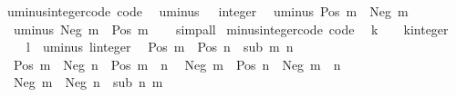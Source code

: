 \begin{isabellebody}
\isanewline
{}\isamarkupfalse%
\ uminus{\isacharunderscore}{\kern0pt}integer{\isacharunderscore}{\kern0pt}code\ {\isacharbrackleft}{\kern0pt}code{\isacharbrackright}{\kern0pt}{\isacharcolon}{\kern0pt}\isanewline
\ \ {\isachardoublequoteopen}uminus\ {}\ {\isacharequal}{\kern0pt}\ {\isacharparenleft}{\kern0pt}{}{\isacharcolon}{\kern0pt}{\isacharcolon}{\kern0pt}integer{\isacharparenright}{\kern0pt}{\isachardoublequoteclose}\isanewline
\ \ {\isachardoublequoteopen}uminus\ {\isacharparenleft}{\kern0pt}Pos\ m{\isacharparenright}{\kern0pt}\ {\isacharequal}{\kern0pt}\ Neg\ m{\isachardoublequoteclose}\isanewline
\ \ {\isachardoublequoteopen}uminus\ {\isacharparenleft}{\kern0pt}Neg\ m{\isacharparenright}{\kern0pt}\ {\isacharequal}{\kern0pt}\ Pos\ m{\isachardoublequoteclose}\isanewline
%
\isadelimproof
\ \ %
\endisadelimproof
%
\isatagproof
{}\isamarkupfalse%
\ simp{\isacharunderscore}{\kern0pt}all%
\endisatagproof
{\isafoldproof}%
%
\isadelimproof
\isanewline
%
\endisadelimproof
\isanewline
{}\isamarkupfalse%
\ minus{\isacharunderscore}{\kern0pt}integer{\isacharunderscore}{\kern0pt}code\ {\isacharbrackleft}{\kern0pt}code{\isacharbrackright}{\kern0pt}{\isacharcolon}{\kern0pt}\isanewline
\ \ {\isachardoublequoteopen}k\ {\isacharminus}{\kern0pt}\ {}\ {\isacharequal}{\kern0pt}\ {\isacharparenleft}{\kern0pt}k{\isacharcolon}{\kern0pt}{\isacharcolon}{\kern0pt}integer{\isacharparenright}{\kern0pt}{\isachardoublequoteclose}\isanewline
\ \ {\isachardoublequoteopen}{}\ {\isacharminus}{\kern0pt}\ l\ {\isacharequal}{\kern0pt}\ uminus\ {\isacharparenleft}{\kern0pt}l{\isacharcolon}{\kern0pt}{\isacharcolon}{\kern0pt}integer{\isacharparenright}{\kern0pt}{\isachardoublequoteclose}\isanewline
\ \ {\isachardoublequoteopen}Pos\ m\ {\isacharminus}{\kern0pt}\ Pos\ n\ {\isacharequal}{\kern0pt}\ sub\ m\ n{\isachardoublequoteclose}\isanewline
\ \ {\isachardoublequoteopen}Pos\ m\ {\isacharminus}{\kern0pt}\ Neg\ n\ {\isacharequal}{\kern0pt}\ Pos\ {\isacharparenleft}{\kern0pt}m\ {\isacharplus}{\kern0pt}\ n{\isacharparenright}{\kern0pt}{\isachardoublequoteclose}\isanewline
\ \ {\isachardoublequoteopen}Neg\ m\ {\isacharminus}{\kern0pt}\ Pos\ n\ {\isacharequal}{\kern0pt}\ Neg\ {\isacharparenleft}{\kern0pt}m\ {\isacharplus}{\kern0pt}\ n{\isacharparenright}{\kern0pt}{\isachardoublequoteclose}\isanewline
\ \ {\isachardoublequoteopen}Neg\ m\ {\isacharminus}{\kern0pt}\ Neg\ n\ {\isacharequal}{\kern0pt}\ sub\ n\ m{\isachardoublequoteclose}\isanewline
%
\isadelimproof
\ \ %
\endisadelimproof
%
\isatagproof
{}\isamarkupfalse%

\end{isabellebody}
